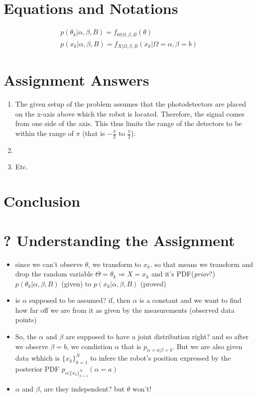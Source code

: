 \documentclass[a4paper,11pt]{article}
\begin{document}
\section*{Equations and Notations}
\begin{eqnarray}
	p(\theta_k | \alpha, \beta, B) = f_{\Theta | \Omega, \beta, B}(\theta)\\
	p(x_k |\alpha, \beta, B) = f_{X | \Omega, \beta, B}(x_k | \Omega = \alpha, \beta = b )
\end{eqnarray}

\section*{Assignment Answers}
\begin{enumerate}
  \item The given setup of the problem assumes that the photodetectors are placed on the x-axis above which the robot is located. Therefore, the signal comes from one side of the axis. This thus limits the range of the detectors to be within the range of $\pi$ (that is $-\frac{\pi}{2}$ to $\frac{\pi}{2}$). 
  \item 
  \item Etc.
\end{enumerate}

\section*{Conclusion}

\newpage
\appendix

\section{? Understanding the Assignment}
\begin{itemize}
	\item since we can't observe $\theta$, we transform to $x_k$. so that means we transform and drop the random variable $\Theta = \theta_k \Rightarrow X = x_k$  and it's PDF(\emph{prior}?) $p(\theta_k | \alpha, \beta, B)$ (given) to $p(x_k | \alpha, \beta, B)$ (proved)
	\item is $\alpha$ supposed to be assumed? if, then $\alpha$ is a constant and we want to find how far off we are from it as given by the measurements (observed data points)
	\item So, the $\alpha$ and $\beta$ are supposed to have a joint distribution right? and so after we observe $\beta = b$, we condistion $\alpha$ that is $p_{\alpha = a | \beta = b}$. But we are also given data whhich is $\{x_k\}^N _{k = 1}$ to infere the robot's position expressed by the posterior PDF $p_{\alpha | \{x_k\}^N _{k = 1}}(\alpha = a)$
	\item $\alpha$ and $\beta$, are they independent? but $\theta$ won't!
\end{itemize}
\end{document}
